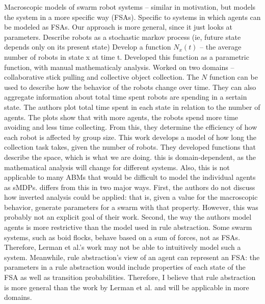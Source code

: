 Macroscopic models of swarm robot systems \cite{lerman2002mmf}\cite{lerman2005rpm} -- similar in motivation, but models the system in a more specific way (FSAs). Specific to systems in which agents can be modeled as FSAs. Our approach is more general, since it just looks at parameters.
Describe robots as a stochastic markov process (ie, future state depends only on its present state)
Develop a function $N_x(t)$ -- the average number of robots in state x at time t.
Developed this function as a parametric function, with manual mathematicaly analysis.
Worked on two domains -- collaborative stick pulling and collective object collection.
The $N$ function can be used to describe how the behavior of the robots change over time.
They can also aggregate information about total time spent robots are spending in a sertain state.
The authors plot total time spent in each state in relation to the number of agents.
The plots show that with more agents, the robots spend more time avoiding and less time collecting.
From this, they determine the efficiency of how each robot is affected by group size.
This work develops a model of how long the collection task takes, given the number of robots.
They developed functions that describe the space, which is what we are doing.
this is domain-dependent, as the mathematical analysis will change for different systems.
Also, this is not applicable to many ABMs that would be difficult to model the individual agents as sMDPs.
\fw differs from this in two major ways. First, the authors do not discuss how inverted analysis could be applied:
that is, given a value for the macroscopic behavior, generate parameters for a swarm with that property. However,
this was probably not an explicit goal of their work.
Second, the way the authors model agents is more restrictive than the model used in rule abstraction. Some swarm systems,
such as boid flocks, behave based on a sum of forces, not as FSAs. Therefore, Lerman et al.'s work may not be able to intuitively
model such a system. Meanwhile, rule abstraction's view of an agent can represent an FSA:
the parameters in a rule abstraction would include properties of each state of the FSA as well as transition probabilities.
Therefore, I believe that rule abstraction is more general than the work by Lerman et al. and will be applicable in more domains.






